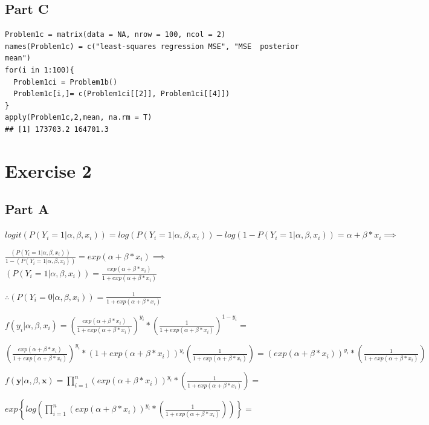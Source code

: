 \documentclass{article}\usepackage[]{graphicx}\usepackage[]{color}
\makeatletter
\newenvironment{kframe}{%
 \def\at@end@of@kframe{}%
 \ifinner\ifhmode%
  \def\at@end@of@kframe{\end{minipage}}%
  \begin{minipage}{\columnwidth}%
 \fi\fi%
 \def\FrameCommand##1{\hskip\@totalleftmargin \hskip-\fboxsep
 \colorbox{shadecolor}{##1}\hskip-\fboxsep
     \hskip-\linewidth \hskip-\@totalleftmargin \hskip\columnwidth}%
 \MakeFramed {\advance\hsize-\width
   \@totalleftmargin\z@ \linewidth\hsize
   \@setminipage}}%
 {\par\unskip\endMakeFramed%
 \at@end@of@kframe}
\newenvironment{knitrout}{}{} %
\makeatother
\begin{document}
\subsection*{Part C}
\begin{knitrout}
\color{fgcolor}\begin{kframe}
\begin{verbatim}
Problem1c = matrix(data = NA, nrow = 100, ncol = 2)
names(Problem1c) = c("least-squares regression MSE", "MSE  posterior mean")
for(i in 1:100){
  Problem1ci = Problem1b()
  Problem1c[i,]= c(Problem1ci[[2]], Problem1ci[[4]])
}
apply(Problem1c,2,mean, na.rm = T)
## [1] 173703.2 164701.3
\end{verbatim}
\end{kframe}
\end{knitrout}
\section*{Exercise 2}
\subsection*{Part A}
$logit(P(Y_{i}=1|\alpha,\beta,x_{i}))=log(P(Y_{i}=1|\alpha,\beta,x_{i}))-log(1-P(Y_{i}=1|\alpha,\beta,x_{i}))=\alpha+\beta*x_{i}\implies$

$\frac{(P(Y_{i}=1|\alpha,\beta,x_{i}))}{1-(P(Y_{i}=1|\alpha,\beta,x_{i}))}=exp(\alpha+\beta*x_{i})\implies$
$(P(Y_{i}=1|\alpha,\beta,x_{i}))=\frac{exp(\alpha+\beta*x_{i})}{1+exp(\alpha+\beta*x_{i})}$

$\therefore (P(Y_{i}=0|\alpha,\beta,x_{i})) = \frac{1}{1+exp(\alpha+\beta*x_{i})}$

$f(y_{i}|\alpha,\beta,x_{i})=\left(\frac{exp(\alpha+\beta*x_{i})}{1+exp(\alpha+\beta*x_{i})}\right)^{y_{i}}*\left(\frac{1}{1+exp(\alpha+\beta*x_{i})}\right)^{1-y_{i}}=$

$\left(\frac{exp(\alpha+\beta*x_{i})}{1+exp(\alpha+\beta*x_{i})}\right)^{y_{i}}*\left(1+exp(\alpha+\beta*x_{i})\right)^{y_{i}}\left(\frac{1}{1+exp(\alpha+\beta*x_{i})}\right)=\left(exp(\alpha+\beta*x_{i})\right)^{y_{i}}*\left(\frac{1}{1+exp(\alpha+\beta*x_{i})}\right)$

$\ensuremath{f(\boldsymbol{y}|\alpha,\beta,\boldsymbol{x})=\prod_{i=1}^{n}\left(exp(\alpha+\beta*x_{i})\right)^{y_{i}}*\left(\frac{1}{1+exp(\alpha+\beta*x_{i})}\right)=}$

$exp\left\{ log\left(\prod_{i=1}^{n}\left(exp(\alpha+\beta*x_{i})\right)^{y_{i}}*\left(\frac{1}{1+exp(\alpha+\beta*x_{i})}\right)\right)\right\} =$
\end{document}
